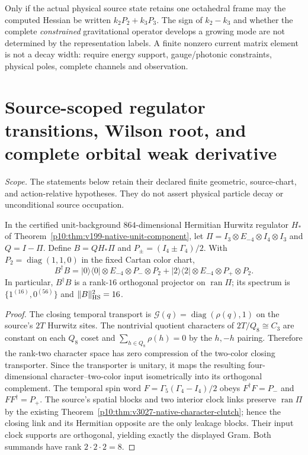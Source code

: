 \documentclass[12pt,a4paper]{article}
\begin{document}
\begin{remark}
\label{bh:berger:v117:p7a:instability}
Only if the actual physical source state retains one octahedral
frame may the computed Hessian be written $k_2P_2+k_3P_3$.
The sign of $k_2-k_3$ and whether the complete \emph{constrained}
gravitational operator develops a growing mode are not determined by
the representation labels. A finite nonzero current matrix element
is not a decay width: require energy support, gauge/photonic
constraints, physical poles, complete channels and observation.
\end{remark}




\section{Source-scoped regulator transitions, Wilson root, and complete orbital weak derivative}
\noindent\emph{Scope.} The statements below retain their declared finite geometric, source-chart, and action-relative hypotheses. They do not assert physical particle decay or unconditional source occupation.
\begin{theorem}
\label{p10:thm:v368-character-bright-projector}
In the certified unit-background $864$-dimensional Hermitian Hurwitz
regulator $H_*$ of Theorem~\ref{p10:thm:v199-native-unit-component},
let $\Pi=I_{3}\otimes E_{-4}\otimes I_{4}\otimes I_{3}$ and
$Q=I-\Pi$. Define $B=QH_*\Pi$ and $P_\pm=(I_4\pm\Gamma_4)/2$.
With $P_2=\operatorname{diag}(1,1,0)$ in the fixed Cartan color chart,
\[
\boxed{B^\dagger B=
 |0\rangle\langle0|\otimes E_{-4}\otimes P_-\otimes P_2
 +|2\rangle\langle2|\otimes E_{-4}\otimes P_+\otimes P_2.}
\]
In particular, $B^\dagger B$ is a rank-$16$ orthogonal projector on
$\operatorname{ran}\Pi$; its spectrum is
$\{1^{(16)},0^{(56)}\}$ and $\|B\|_{\rm HS}^{2}=16$.
\end{theorem}
\begin{proof}
The closing temporal transport is
$\mathcal G(q)=\operatorname{diag}(\rho(q),1)$ on the source's
$2T$ Hurwitz sites. The nontrivial quotient characters of
$2T/Q_8\cong C_3$ are constant on each $Q_8$ coset and
$\sum_{h\in Q_8}\rho(h)=0$ by the $h,-h$ pairing. Therefore the
rank-two character space has zero compression of the two-color
closing transporter. Since the transporter is unitary, it maps
the resulting four-dimensional character--two-color input
isometrically into its orthogonal complement. The temporal spin word
$F=\Gamma_5(\Gamma_4-I_4)/2$ obeys
$F^\dagger F=P_-$ and $FF^\dagger=P_+$.
The source's spatial blocks and two interior clock links preserve
$\operatorname{ran}\Pi$ by the existing
Theorem~\ref{p10:thm:v3027-native-character-clutch}; hence the
closing link and its Hermitian opposite are the only leakage blocks.
Their input clock supports are orthogonal, yielding exactly the
displayed Gram. Both summands have rank $2\cdot2\cdot2=8$.
\end{proof}
\end{document}
